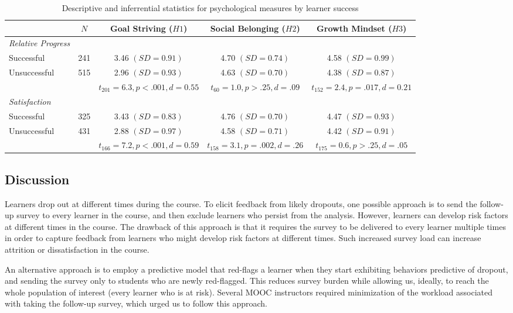 \documentclass{sigchi}\usepackage[]{graphicx}\usepackage[]{color}
\begin{document}
\begin{table*}[ht]
\caption{Descriptive and inferrential statistics for psychological measures by learner success}
\label{tab:psych}
\small
\center
\begin{tabular}{lcccc}
\toprule
 & $N$ & Goal Striving ($H1$) & Social Belonging ($H2$) & Growth Mindset ($H3$) \\
\midrule
\emph{Relative Progress} &  &  &  \\
\quad Successful & 241 & 3.46 $(SD=0.91)$ & 4.70 $(SD=0.74)$ &  4.58 $(SD=0.99)$ \\
\quad Unsuccessful & 515 & 2.96 $(SD=0.93)$ & 4.63 $(SD=0.70)$ & 4.38 $(SD=0.87)$ \\
 &  & $t_{201}=6.3, p<.001, d=0.55$ & $t_{60}=1.0, p>.25, d=.09$ & $t_{152}=2.4, p=.017, d=0.21$ \\
 \emph{Satisfaction} &  &  &  \\
\quad Successful & 325 & 3.43 $(SD=0.83)$ & 4.76 $(SD=0.70)$ & 4.47 $(SD=0.93)$ \\
\quad Unsuccessful & 431 & 2.88 $(SD=0.97)$ & 4.58 $(SD=0.71)$ & 4.42 $(SD=0.91)$ \\
&  & $t_{166}=7.2, p<.001, d=0.59$ & $t_{158}=3.1, p=.002, d=.26$ & $t_{175}=0.6, p>.25, d=.05$ \\
\bottomrule
\end{tabular}
\end{table*}



\subsection{Discussion}

Learners drop out at different times during the course. To elicit feedback from likely dropouts, one possible approach is to send the follow-up survey to every learner in the course, and then exclude learners who persist from the analysis. However, learners can develop risk factors at different times in the course. The drawback of this approach is that it requires the survey to be delivered to every learner multiple times in order to capture feedback from learners who might develop risk factors at different times. Such increased survey load can increase attrition or dissatisfaction in the course.

An alternative approach is to employ a predictive model that red-flags a learner when they start exhibiting behaviors predictive of dropout, and sending the survey only to students who are newly red-flagged. This reduces survey burden while allowing us, ideally, to reach the whole population of interest (every learner who is at risk). Several MOOC instructors required minimization of the workload associated with taking the follow-up survey, which urged us to follow this approach.
\end{document}
